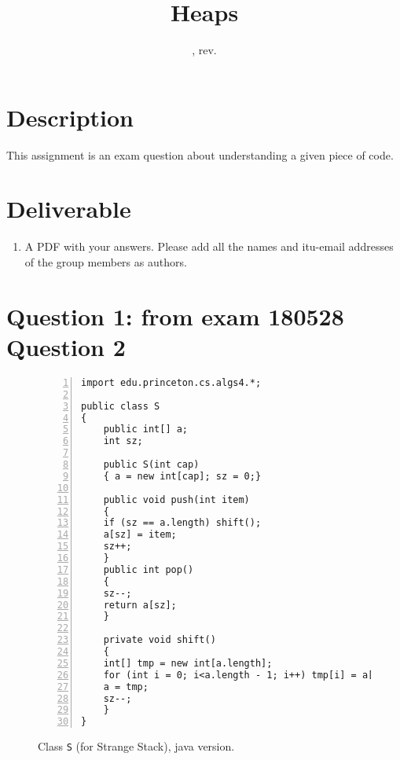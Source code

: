 \documentclass{tufte-handout}
\title{Heaps}
\author{}
\date{\GITAuthorDate, rev. \GITAbrHash}
\begin{document}
\maketitle

\section{\textbf{Description}}
This assignment is an exam question about understanding a given piece of code.

\section{\textbf{Deliverable}}
\begin{enumerate}
\item A PDF with your answers.
    Please add all the names and itu-email addresses of the group members as authors.
\end{enumerate}


\section{\textbf{Question 1}: from exam 180528 Question 2}
  \begin{figure}
    
    \begin{lstlisting}[basicstyle=\ttfamily,backgroundcolor=\color{white},
      frame=single,rulecolor=\color{gray!20},framesep=10pt,
      linewidth=12cm,numbers= left]
import edu.princeton.cs.algs4.*;

public class S
{
    public int[] a;
    int sz;

    public S(int cap)
    { a = new int[cap]; sz = 0;}

    public void push(int item)
    {
	if (sz == a.length) shift();
	a[sz] = item;
	sz++;
    }
    public int pop()
    {   
	sz--;
	return a[sz];
    }

    private void shift()
    {
	int[] tmp = new int[a.length];
	for (int i = 0; i<a.length - 1; i++) tmp[i] = a[i+1];
	a = tmp;
	sz--;
    }
}
    \end{lstlisting}
    \caption{\label{fig: S-java} Class {\tt S} (for Strange Stack), java version.}
  \end{figure}
\end{document}
